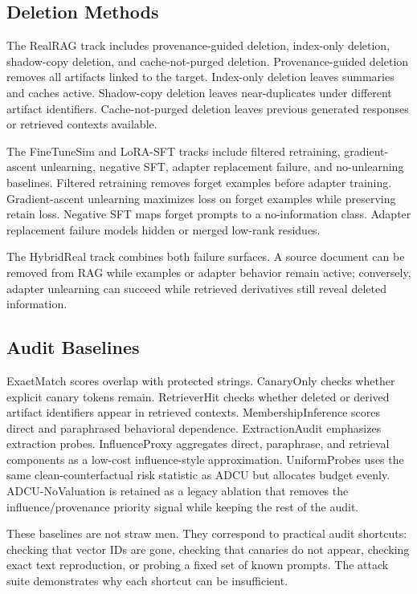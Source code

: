 \documentclass[10pt,journal,compsoc]{IEEEtran}
\newcommand{\method}{ADCU}
\begin{document}
\subsection{Deletion Methods}

The RealRAG track includes provenance-guided deletion, index-only deletion, shadow-copy deletion, and cache-not-purged deletion. Provenance-guided deletion removes all artifacts linked to the target. Index-only deletion leaves summaries and caches active. Shadow-copy deletion leaves near-duplicates under different artifact identifiers. Cache-not-purged deletion leaves previous generated responses or retrieved contexts available.

The FineTuneSim and LoRA-SFT tracks include filtered retraining, gradient-ascent unlearning, negative SFT, adapter replacement failure, and no-unlearning baselines. Filtered retraining removes forget examples before adapter training. Gradient-ascent unlearning maximizes loss on forget examples while preserving retain loss. Negative SFT maps forget prompts to a no-information class. Adapter replacement failure models hidden or merged low-rank residues.

The HybridReal track combines both failure surfaces. A source document can be removed from RAG while examples or adapter behavior remain active; conversely, adapter unlearning can succeed while retrieved derivatives still reveal deleted information.

\subsection{Audit Baselines}

ExactMatch scores overlap with protected strings. CanaryOnly checks whether explicit canary tokens remain. RetrieverHit checks whether deleted or derived artifact identifiers appear in retrieved contexts. MembershipInference scores direct and paraphrased behavioral dependence. ExtractionAudit emphasizes extraction probes. InfluenceProxy aggregates direct, paraphrase, and retrieval components as a low-cost influence-style approximation. UniformProbes uses the same clean-counterfactual risk statistic as \method{} but allocates budget evenly. ADCU-NoValuation is retained as a legacy ablation that removes the influence/provenance priority signal while keeping the rest of the audit.

These baselines are not straw men. They correspond to practical audit shortcuts: checking that vector IDs are gone, checking that canaries do not appear, checking exact text reproduction, or probing a fixed set of known prompts. The attack suite demonstrates why each shortcut can be insufficient.
\end{document}
